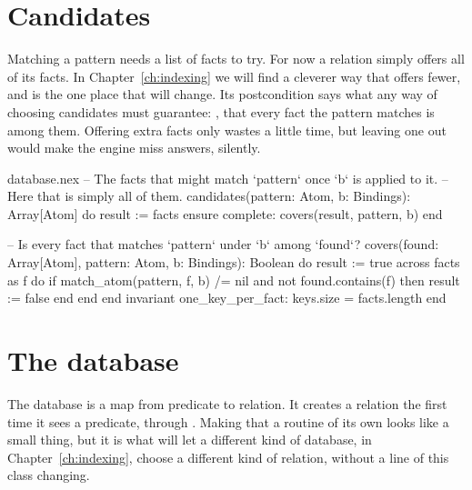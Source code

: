 \section{Candidates}

Matching a pattern needs a list of facts to try. For now a relation simply
offers all of its facts. In Chapter~\ref{ch:indexing} we will find a
cleverer way that offers fewer, and  is the one place that
will change. Its postcondition says what any way of choosing candidates
must guarantee: , that every fact the pattern matches is
among them. Offering extra facts only wastes a little time, but leaving one
out would make the engine miss answers, silently.

\begin{continued}{database.nex}
  -- The facts that might match `pattern` once `b` is applied to it.
  -- Here that is simply all of them.
  candidates(pattern: Atom, b: Bindings): Array[Atom]
  do
    result := facts
  ensure
    complete: covers(result, pattern, b)
  end

  -- Is every fact that matches `pattern` under `b` among `found`?
  covers(found: Array[Atom], pattern: Atom, b: Bindings): Boolean
  do
    result := true
    across facts as f do
      if match_atom(pattern, f, b) /= nil and not found.contains(f) then
        result := false
      end
    end
  end
invariant
  one_key_per_fact: keys.size = facts.length
end
\end{continued}

\section{The database}

The database is a map from predicate to relation. It creates a relation the
first time it sees a predicate, through . Making that a
routine of its own looks like a small thing, but it is what will let a
different kind of database, in Chapter~\ref{ch:indexing}, choose a
different kind of relation, without a line of this class changing.

